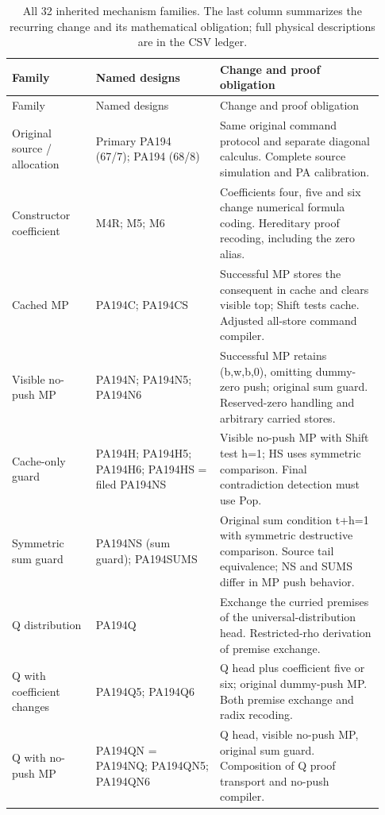 \begingroup\small\setlength{\tabcolsep}{3pt}
\begin{longtable}{>{\raggedright\arraybackslash}p{0.21\linewidth}>{\raggedright\arraybackslash}p{0.31\linewidth}>{\raggedright\arraybackslash}p{0.41\linewidth}}
\caption{All 32 inherited mechanism families. The last column summarizes the recurring change and its mathematical obligation; full physical descriptions are in the CSV ledger.}\\
\toprule Family&Named designs&Change and proof obligation\\\midrule\endfirsthead
\toprule Family&Named designs&Change and proof obligation\\\midrule\endhead
\bottomrule\endfoot
Original source /\allowbreak{} allocation&Primary PA194 (67/\allowbreak{}7); PA194 (68/\allowbreak{}8)&Same original command protocol and separate diagonal calculus. Complete source simulation and PA calibration.\\[5pt]
Constructor coefficient&M4R; M5; M6&Coefficients four, five and six change numerical formula coding. Hereditary proof recoding, including the zero alias.\\[5pt]
Cached MP&PA194C; PA194CS&Successful MP stores the consequent in cache and clears visible top; Shift tests cache. Adjusted all-store command compiler.\\[5pt]
Visible no-push MP&PA194N; PA194N5; PA194N6&Successful MP retains (b,w,b,0), omitting dummy-zero push; original sum guard. Reserved-zero handling and arbitrary carried stores.\\[5pt]
Cache-only guard&PA194H; PA194H5; PA194H6; PA194HS = filed PA194NS&Visible no-push MP with Shift test h=1; HS uses symmetric comparison. Final contradiction detection must use Pop.\\[5pt]
Symmetric sum guard&PA194NS (sum guard); PA194SUMS&Original sum condition t+h=1 with symmetric destructive comparison. Source tail equivalence; NS and SUMS differ in MP push behavior.\\[5pt]
Q distribution&PA194Q&Exchange the curried premises of the universal-distribution head. Restricted-rho derivation of premise exchange.\\[5pt]
Q with coefficient changes&PA194Q5; PA194Q6&Q head plus coefficient five or six; original dummy-push MP. Both premise exchange and radix recoding.\\[5pt]
Q with no-push MP&PA194QN = PA194NQ; PA194QN5; PA194QN6&Q head, visible no-push MP, original sum guard. Composition of Q proof transport and no-push compiler.\\[5pt]

\end{longtable}
